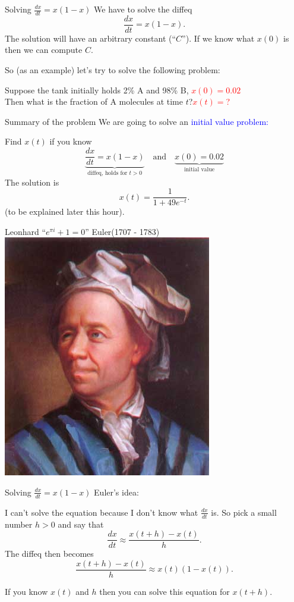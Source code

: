 \documentclass{beamer}
\begin{document}
\begin{frame}{Solving $\frac{dx} {dt} = x(1-x)$}
  We have to solve the diffeq
  \[
  \frac{dx} {dt} = x(1-x).
  \]
  The solution will have an arbitrary constant (``$C$'').  If we know what
  $x(0)$ is then we can compute $C$.\pause

  So (as an example) let's try to solve the following problem:\pause

  Suppose the tank initially holds 2\% A and 98\% B,\pause \hfill
  \textcolor{red}{$x(0)=0.02$}\pause\\
  Then what is the fraction of A molecules at time
  $t$?\hfill\pause \textcolor{red}{$x(t) = $?} 

\end{frame}

\begin{frame}{Summary of the problem}
  We are going to solve an \textcolor{blue}{initial value problem:}\pause

  Find $x(t)$ if you know 
  \[
  \underbrace{\frac{dx} {dt} = x(1-x)}_{\text{diffeq, holds for }t>0}
  \quad\text{and}\quad
  \underbrace{x(0)=0.02}_{\text{initial value}}
  \]\pause
  The solution is
  \[
  x(t) = \frac{1} {1+49e^{-t}}.
  \]
  (to be explained later this hour).
\end{frame}
\begin{frame}{Leonhard ``$e^{\pi i} + 1 = 0$'' Euler\hfill (1707 - 1783)}\centering
  \includegraphics[scale=0.5]{Euler_9.jpeg}

\end{frame}
\begin{frame}{Solving $\frac{dx} {dt} = x(1-x)$}
  Euler's idea:\pause

  I can't solve the equation because I don't know what
  $\frac{dx} {dt}$ is.  So pick a small number $h>0$ and say that
  \[
  \frac{dx} {dt} \approx \frac{x(t+h) - x(t)} {h}.
  \]\pause
  The diffeq then becomes
  \[
  \frac{x(t+h) - x(t)} {h} \approx x(t)(1-x(t)).
  \]
  \pause

  If you know $x(t)$ and $h$ then you can solve this equation for $x(t+h)$.
\end{frame}
\end{document}
